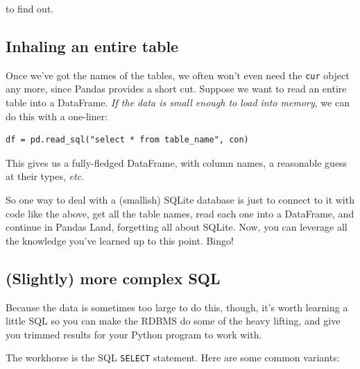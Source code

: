 to find out.

\subsection{Inhaling an entire table}

Once we've got the names of the tables, we often won't even need the
\texttt{cur} object any more, since Pandas provides a short cut. Suppose we
want to read an entire table into a DataFrame. \textit{If the data is small
enough to load into memory}, we can do this with a one-liner:

\begin{Verbatim}[fontsize=\small,samepage=true,frame=single]
df = pd.read_sql("select * from table_name", con)
\end{Verbatim}

This gives us a fully-fledged DataFrame, with column names, a reasonable guess
at their types, \textit{etc.} 

So one way to deal with a (smallish) SQLite database is just to connect to it
with code like the above, get all the table names, read each one into a
DataFrame, and continue in Pandas Land, forgetting all about SQLite. Now, you
can leverage all the knowledge you've learned up to this point. Bingo!

\subsection{(Slightly) more complex SQL}

Because the data is sometimes too large to do this, though, it's worth
learning a little SQL so you can make the RDBMS do some of the heavy lifting,
and give you trimmed results for your Python program to work with.

The workhorse is the SQL \texttt{SELECT} statement. Here are some common
variants:

